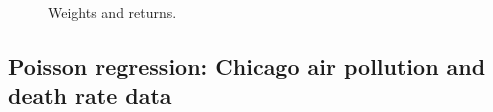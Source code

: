 \documentclass[aos]{imsart}
\numberwithin{equation}{section}
\theoremstyle{plain}
\begin{document}
\begin{figure}[ht]
{    }\
    \
    \caption{		
	 Weights and returns.}	
    \label{fig:portfolio}
\end{figure}




\subsection{Poisson regression: Chicago air pollution and death rate data}
\label{sec:poisson_regression}
\end{document}
